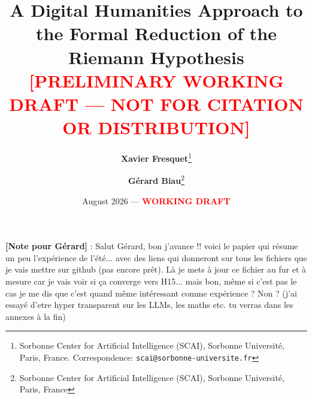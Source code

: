 \documentclass[11pt,a4paper]{article}
\title{\textbf{A Digital Humanities Approach to the Formal Reduction of the Riemann Hypothesis}\\[0.5em]
\large\textcolor{red}{\textbf{[PRELIMINARY WORKING DRAFT --- NOT FOR CITATION OR DISTRIBUTION]}}}
\author{\textbf{Xavier Fresquet}\thanks{Sorbonne Center for Artificial Intelligence (SCAI), Sorbonne Universit\'e, Paris, France. Correspondence: \texttt{scai@sorbonne-universite.fr}}
\and
\textbf{G\'erard Biau}\thanks{Sorbonne Center for Artificial Intelligence (SCAI), Sorbonne Universit\'e, Paris, France}}
\date{August 2026 \quad --- \quad \textbf{\textcolor{red}{WORKING DRAFT}}}
\theoremstyle{plain}
\theoremstyle{definition}
\theoremstyle{remark}
\begin{document}
\maketitle

\begin{center}
\colorbox{red!10}{}
\end{center}
\vspace{1em}

{\noindent\color{red}\textbf{[Note pour Gérard]} : Salut Gérard, bon j'avance !! voici le papier qui résume un peu l'expérience de l'été... avec des liens qui donneront sur tous les fichiers que je vais mettre sur github (pas encore prêt). Là je mets à jour ce fichier au fur et à mesure car je vais voir si ça converge vers H15... mais bon, même si c'est pas le cas je me dis que c'est quand même intéressant comme expérience ? Non ? (j'ai essayé d'etre hyper transparent sur les LLMs, les maths etc. tu verras dans les annexes à la fin)\par\vspace{1.5em}}
\end{document}
